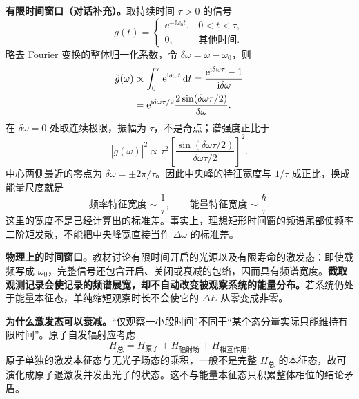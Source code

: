 \textbf{有限时间窗口（对话补充）。}取持续时间 $\tau>0$ 的信号
\begin{equation}
  g(t)=\begin{cases}
    \ee^{-\ii\omega_0t},&0<t<\tau,\\
    0,&\text{其他时间}.
  \end{cases}
\end{equation}
略去 Fourier 变换的整体归一化系数，令 $\delta\omega=\omega-\omega_0$，则
\begin{align}
  \widetilde g(\omega)
    &\propto\int_0^\tau\mathrm{e}^{\mathrm{i}\delta\omega t}\mathop{}\!\mathrm{d} t
     =\frac{\mathrm{e}^{\mathrm{i}\delta\omega\tau}-1}{\mathrm{i}\delta\omega}\notag\\
    &=\mathrm{e}^{\mathrm{i}\delta\omega\tau/2}
      \frac{2\sin(\delta\omega\tau/2)}{\delta\omega}.
\end{align}
在 $\delta\omega=0$ 处取连续极限，振幅为 $\tau$，不是奇点；谱强度正比于
\begin{equation}
  |\widetilde g(\omega)|^2\propto
   \tau^2\left[\frac{\sin(\delta\omega\tau/2)}{\delta\omega\tau/2}\right]^2.
\end{equation}
中心两侧最近的零点为 $\delta\omega=\pm2\pi/\tau$。因此中央峰的特征宽度与 $1/\tau$ 成正比，换成能量尺度就是
\begin{equation}
  \boxed{\text{频率特征宽度}\sim\frac1\tau,
  \qquad\text{能量特征宽度}\sim\frac\hbar\tau}.
\end{equation}
这里的宽度不是已经计算出的标准差。事实上，理想矩形时间窗的频谱尾部使频率二阶矩发散，不能把中央峰宽直接当作 $\Delta\omega$ 的标准差。

\textbf{物理上的时间窗口。}教材讨论有限时间开启的光源以及有限寿命的激发态：即使载频写成 $\omega_0$，完整信号还包含开启、关闭或衰减的包络，因而具有频谱宽度。\textbf{截取观测记录会使记录的频谱展宽，却不自动改变被观察系统的能量分布。}若系统仍处于能量本征态，单纯缩短观察时长不会使它的 $\Delta E$ 从零变成非零。

\textbf{为什么激发态可以衰减。}“仅观察一小段时间”不同于“某个态分量实际只能维持有限时间”。原子自发辐射应考虑
\begin{equation}
  H_{\text{总}}=H_{\text{原子}}+H_{\text{辐射场}}+H_{\text{相互作用}}.
\end{equation}
原子单独的激发本征态与无光子场态的乘积，一般不是完整 $H_{\text{总}}$ 的本征态，故可演化成原子退激发并发出光子的状态。这不与能量本征态只积累整体相位的结论矛盾。

